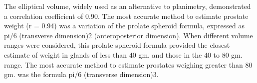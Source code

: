  The elliptical volume, widely used as an alternative to planimetry, demonstrated a correlation coefficient of 0.90. The most accurate method to estimate prostate weight (r = 0.94) was a variation of the prolate spheroid formula, expressed as pi/6 (transverse dimension)2 (anteroposterior dimension). When different volume ranges were considered, this prolate spheroid formula provided the closest estimate of weight in glands of less than 40 gm. and those in the 40 to 80 gm. range. The most accurate method to estimate prostates weighing greater than 80 gm. was the formula pi/6 (transverse dimension)3. 